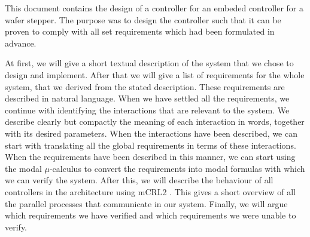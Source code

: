 This document contains the design of a controller for an embeded controller for a wafer stepper. The purpose was to design the controller such that it can be proven to comply with all set requirements which had been formulated in advance.

At first, we will give a short textual description of the system that we chose to design and implement. After that we will give a list of requirements for the whole system, that we derived from the stated description. These requirements are described in natural language. When we have settled all the requirements, we continue with identifying the interactions that are relevant to the system. We describe clearly but compactly the meaning of each interaction in words, together with its desired parameters. When the interactions have been described, we can start with translating all the global requirements in terms of these interactions. When the requirements have been described in this manner, we can start using the modal $\mu$-calculus to convert the requirements into modal formulas with which we can verify the system. After this, we will describe the behaviour of all controllers in the architecture using mCRL2 \cite{url:mcrl}. This gives a short overview of all the parallel processes that communicate in our system. Finally, we will argue which requirements we have verified and which requirements we were unable to verify.
